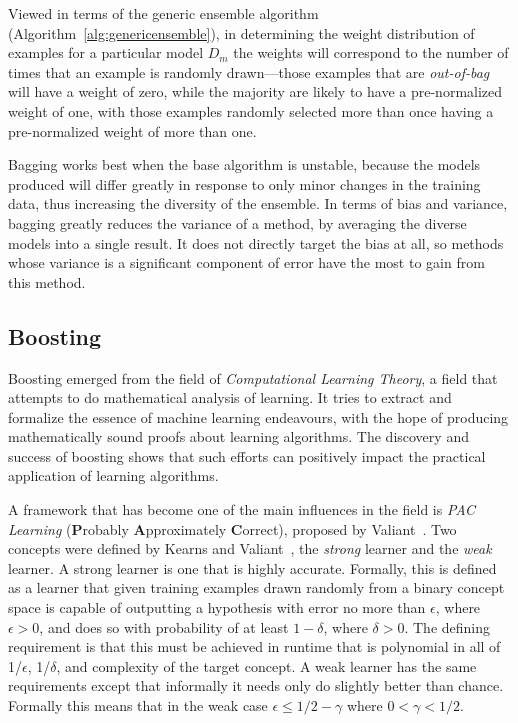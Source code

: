Viewed in terms of the generic ensemble algorithm (Algorithm~\ref{alg:genericensemble}), in determining the weight distribution of examples for a particular model $D_{m}$ the weights will correspond to the number of times that an example is randomly drawn---those examples that are {\em out-of-bag} will have a weight of zero, while the majority are likely to have a pre-normalized weight of one, with those examples randomly selected more than once having a pre-normalized weight of more than one.

Bagging works best when the base algorithm is unstable, because the models produced will differ greatly in response to only minor changes in the training data, thus increasing the diversity of the ensemble. In terms of bias and variance, bagging greatly reduces the variance of a method, by averaging the diverse models into a single result. It does not directly target the bias at all, so methods whose variance is a significant component of error have the most to gain from this method.


\subsection{Boosting}
\label{sec:boostingbatch}

Boosting emerged from the field of {\em Computational Learning Theory}, a field that attempts to do mathematical analysis of learning. It tries to extract and formalize the essence of machine learning endeavours, with the hope of producing mathematically sound proofs about learning algorithms. The discovery and success of boosting shows that such efforts can positively impact the practical application of learning algorithms.

A framework that has become one of the main influences in the field is {\em PAC Learning} ({\bf P}robably {\bf A}pproximately {\bf C}orrect), proposed by Valiant~\cite{paclearn}.
Two concepts were defined by Kearns and Valiant~\cite{weakstronglearn}, the {\em strong} learner and the {\em weak} learner. A strong learner is one that is highly accurate. Formally, this is defined as a learner that given training examples drawn randomly from a binary concept space is capable of outputting a hypothesis with error no more than $\epsilon$, where $\epsilon > 0$, and does so with probability of at least $1 - \delta$, where $\delta > 0$. The defining requirement is that this must be achieved in runtime that is polynomial in all of 1/$\epsilon$, 1/$\delta$, and complexity of the target concept. A weak learner has the same requirements except that informally it needs only do slightly better than chance. Formally this means that in the weak case $\epsilon \le 1/2-\gamma$ where $0 < \gamma < 1/2$.

